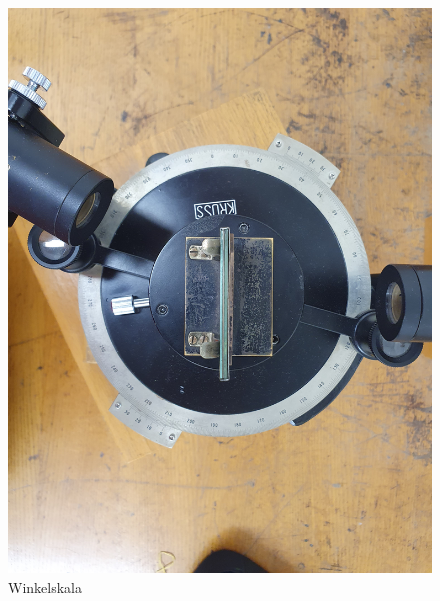 \documentclass[12pt,a4paper,twoside]{article}
\begin{document}
\begin{figure}[H]
    \centering
    \includegraphics[width=0.6\linewidth, angle=-90]{nudes/messskala.jpg}
    \caption{Winkelskala}
    \label{fig:Winkelskala}
\end{figure}
\end{document}
